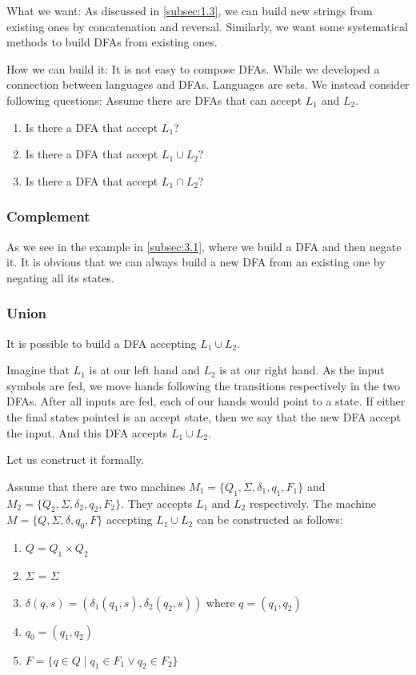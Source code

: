 \documentclass[11pt]{article}
\begin{document}
What we want: As discussed in \ref{subsec:1.3}, we can build new strings from
existing ones by concatenation and reversal. Similarly, we want some systematical
methods to build DFAs from existing ones.

How we can build it: It is not easy to compose DFAs. While we developed a connection
between languages and DFAs. Languages are sets. We instead consider following
questions:
Assume there are DFAs that can accept $L_1$ and $L_2$.
\begin{enumerate}
\item Is there a DFA that accept $\overline{L_1}$?
\item Is there a DFA that accept $L_1 \cup L_2$?
\item Is there a DFA that accept $L_1 \cap L_2$?
\end{enumerate}

\subsubsection{Complement}

As we see in the example in \ref{subsec:3.1}, where we build a DFA and then negate
it. It is obvious that we can always build a new DFA from an existing one by negating
all its states.

\subsubsection{Union} \label{subsubsec:3.3.2}

It is possible to build a DFA accepting $L_1 \cup L_2$.

Imagine that $L_1$ is at our left hand and $L_2$ is at our right hand. As the input
symbols are fed, we move hands following the transitions respectively in the two DFAs. After all inputs are fed, each of our hands would point to a state. If either
the final states pointed is an accept state, then we say that the new DFA accept
the input. And this DFA accepts $L_1 \cup L_2$.

Let us construct it formally.
\begin{definition}
Assume that there are two machines $M_1=\{Q_1,\Sigma,\delta_1,q_1,F_1\}$ and
$M_2 = \{Q_2, \Sigma,\delta_2,q_2,F_2\}$. They accepts $L_1$ and $L_2$ respectively.
The machine $M = \{Q,\Sigma,\delta,q_0,F\}$ accepting $L_1 \cup L_2$ can be
constructed as follows:
\begin{enumerate}
\item $Q = Q_1 \times Q_2$
\item $\Sigma$ = $\Sigma$
\item $\delta(q, s) = (\delta_1(q_1, s), \delta_2(q_2, s))$ where $q = (q_1, q_2)$
\item $q_0 = (q_1, q_2)$
\item $F = \{q \in Q \mid q_1 \in F_1 \vee q_2 \in F_2\}$
\end{enumerate}
\end{definition}
\end{document}
